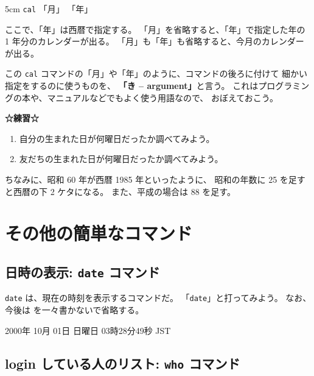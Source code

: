 \begin{coml}{5cm}
\texttt{cal} 「月」 「年」
\end{coml}

ここで、「年」は西暦で指定する。
「月」を省略すると、「年」で指定した年の 1 年分のカレンダーが出る。
「月」も「年」も省略すると、今月のカレンダーが出る。

\bigskip

この \texttt{cal} コマンドの「月」や「年」のように、コマンドの後ろに付けて
細かい指定をするのに使うものを、
 \textbf{「き -- argument」}と言う。
これはプログラミングの本や、マニュアルなどでもよく使う用語なので、
おぼえておこう。

\vspace*{6mm}

\begin{BOXNOTE}
{\large\bf ☆練習☆}
\begin{enumerate}
\item 自分の生まれた日が何曜日だったか調べてみよう。

\item 友だちの生まれた日が何曜日だったか調べてみよう。
\end{enumerate}

ちなみに、昭和 60 年が西暦 1985 年といったように、
昭和の年数に 25 を足すと西暦の下 2 ケタになる。
また、平成の場合は 88 を足す。
\end{BOXNOTE}

\section{その他の簡単なコマンド}

\subsection{日時の表示: \texttt{date} コマンド}

 \texttt{date} は、現在の時刻を表示するコマンドだ。
「\texttt{date}\retrn」と打ってみよう。
なお、今後は \retrn を一々書かないで省略する。

\begin{progls}
2000年 10月 01日 日曜日 03時28分49秒 JST
% 
\end{progls}


\subsection{login している人のリスト: \texttt{who} コマンド}

